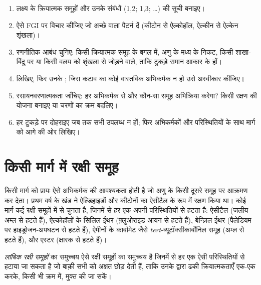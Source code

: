 \begin{method}[पश्च-संश्लेषी विश्लेषण]\label{met:b2:retrosynthesis:retrosynthesis}
\begin{enumerate}
  \item लक्ष्य के क्रियात्मक समूहों और उनके संबंधों (1,2; 1,3; \dots) की सूची बनाइए।
  \item ऐसे FGI पर विचार कीजिए जो अच्छे  वाला पैटर्न दें (कीटोन से ऐल्कोहॉल,
        ऐल्कीन से ऐल्केन शृंखला)।
  \item रणनीतिक आबंध चुनिए: किसी क्रियात्मक समूह के बगल में, अणु के मध्य के निकट, किसी
        शाखा-बिंदु पर या किसी वलय को शृंखला से जोड़ने वाले, ताकि टुकड़े समान आकार के हों।
  \item {} लिखिए, फिर उनके ; जिस कटाव का कोई वास्तविक अभिकर्मक न हो उसे अस्वीकार कीजिए।
  \item रसायनवरणात्मकता जाँचिए: हर अभिकर्मक से और कौन-सा समूह अभिक्रिया करेगा? किसी रक्षण की योजना बनाइए
        या चरणों का क्रम बदलिए।
  \item हर टुकड़े पर दोहराइए जब तक सभी उपलब्ध न हों; फिर अभिकर्मकों और
        परिस्थितियों के साथ मार्ग को आगे की ओर लिखिए।
\end{enumerate}
\end{method}

\section{किसी मार्ग में रक्षी समूह}

किसी मार्ग को प्रायः ऐसे अभिकर्मक की आवश्यकता होती है जो अणु के किसी दूसरे समूह पर आक्रमण कर देता। प्रथम वर्ष के खंड ने
ऐल्डिहाइडों और कीटोनों का ऐसीटैल के रूप में रक्षण किया था। कोई मार्ग कई रक्षी समूहों में से चुनता है, जिनमें से हर एक
अपनी परिस्थितियों से हटता है: ऐसीटैल (जलीय अम्ल से हटते हैं), ऐल्कोहॉलों के सिलिल ईथर (फ़्लुओराइड
आयन से हटते हैं), बेन्ज़िल ईथर (पैलेडियम पर हाइड्रोजन-अपघटन से हटते हैं), ऐमीनों के कार्बामेट जैसे
\textit{tert}-ब्यूटॉक्सीकार्बोनिल समूह (अम्ल से हटते हैं), और एस्टर (क्षारक से हटते हैं)।

\begin{definition}[लांबिक रक्षण]\label{def:b2:retrosynthesis:orthogonal}
\emph{लांबिक रक्षी समूहों} का समुच्चय ऐसे रक्षी
समूहों का समुच्चय है जिनमें से हर एक ऐसी परिस्थितियों से हटाया जा सकता है जो बाक़ी सभी को अक्षत छोड़ देती हैं, ताकि उनके द्वारा ढकी
क्रियात्मकताएँ एक-एक करके, किसी भी क्रम में, मुक्त की जा सकें।
\end{definition}

